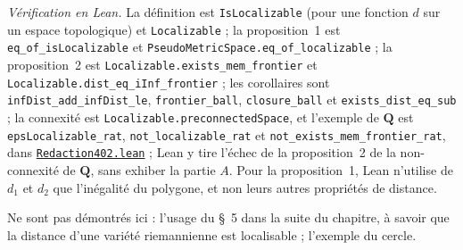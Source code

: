 \begin{sloppypar}
\noindent\emph{Vérification en Lean.} La définition est \texttt{IsLocalizable} (pour une fonction $d$ sur un espace topologique) et \texttt{Localizable} ; la proposition~1 est \texttt{eq\_of\_isLocalizable} et \texttt{PseudoMetricSpace.\allowbreak{}eq\_of\_localizable} ; la proposition~2 est \texttt{Localizable.\allowbreak{}exists\_mem\_frontier} et \texttt{Localizable.\allowbreak{}dist\_eq\_iInf\_frontier} ; les corollaires sont \texttt{infDist\_add\_infDist\_le}, \texttt{frontier\_ball}, \texttt{closure\_ball} et \texttt{exists\_dist\_eq\_sub} ; la connexité est \texttt{Localizable.\allowbreak{}preconnectedSpace}, et l'exemple de $\mathbf Q$ est \texttt{epsLocalizable\_rat}, \texttt{not\_localizable\_rat} et \texttt{not\_exists\_mem\_frontier\_rat}, dans \href{\leanblobmain/Redaction402.lean}{\texttt{Redaction402.\allowbreak{}lean}} ; Lean y tire l'échec de la proposition~2 de la non-connexité de $\mathbf Q$, sans exhiber la partie $A$. Pour la proposition~1, Lean n'utilise de $d_1$ et $d_2$ que l'inégalité du polygone, et non leurs autres propriétés de distance.
\end{sloppypar}

Ne sont pas démontrés ici : l'usage du §~5 dans la suite du chapitre, à savoir que la distance d'une variété riemannienne est localisable ; l'exemple du cercle.


